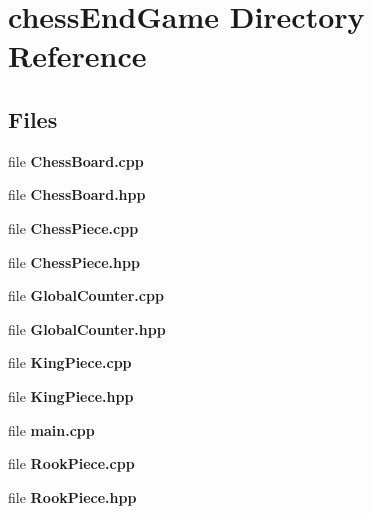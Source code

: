 \section{chess\+End\+Game Directory Reference}
\label{dir_f9c8ce50232a0d47eade43b65b0ea16b}
\subsection*{Files}
\begin{DoxyCompactItemize}
\item 
file \textbf{ Chess\+Board.\+cpp}
\item 
file \textbf{ Chess\+Board.\+hpp}
\item 
file \textbf{ Chess\+Piece.\+cpp}
\item 
file \textbf{ Chess\+Piece.\+hpp}
\item 
file \textbf{ Global\+Counter.\+cpp}
\item 
file \textbf{ Global\+Counter.\+hpp}
\item 
file \textbf{ King\+Piece.\+cpp}
\item 
file \textbf{ King\+Piece.\+hpp}
\item 
file \textbf{ main.\+cpp}
\item 
file \textbf{ Rook\+Piece.\+cpp}
\item 
file \textbf{ Rook\+Piece.\+hpp}
\end{DoxyCompactItemize}

